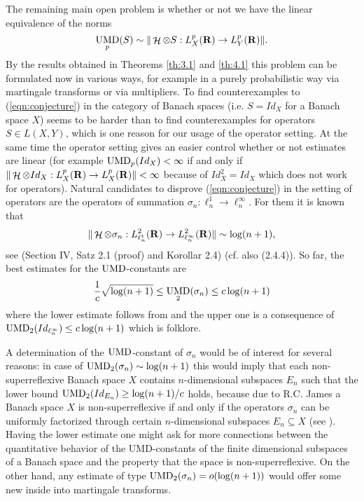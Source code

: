 \documentclass[11pt,a4paper,twoside,draft]{amsart}
\theoremstyle{definition}
\newcommand{\real}{{\bf R}}
\DeclareMathOperator{\htt}{{\mathcal H}}
\DeclareMathOperator{\umd}{{\rm UMD}}
\begin{document}
The remaining main open problem is whether or not we have the linear equivalence 
of the norms
\begin{equation}\label{eqn:conjecture}
        \umd_p(S) 
   \sim \| \htt\otimes S : L^p_X(\real)    \to L_Y^p(\real) \|.
\end{equation}
By the results obtained in Theorems \ref{th:3.1} and  \ref{th:4.1}
this problem can be formulated now in 
various ways, for example in a purely probabilistic way via 
martingale transforms or via multipliers. 
To find counterexamples to (\ref{eqn:conjecture})
in the category of Banach spaces (i.e. $S=Id_X$ for a 
Banach space $X$) seems to be 
harder than to find counterexamples for operators $S\in L(X,Y)$,
which is one reason for our usage of the operator setting.
At the same time the operator setting gives an easier control whether
or not estimates are linear 
(for example 
$\umd_p(Id_X)<\infty$ if and only if 
$\| \htt\otimes Id_X : L^p_X(\real)    \to L_X^p(\real) \|<\infty$
because of $Id_X^2=Id_X$ which does not work for operators).
Natural candidates to disprove (\ref{eqn:conjecture}) 
in the setting of operators are the operators of summation 
$\sigma_n:\ell^1_n\to\ell^\infty_n$. For them it is known that 
\[      \| \htt\otimes \sigma_n : L^2_{\ell^1_n}(\real) \to L_{\ell^\infty_n}^2(\real) \|
   \sim \log(n+1), \]
see \cite{DefantM-PHD} (Section IV, Satz 2.1 (proof) and Korollar 2.4)
(cf. also \cite{Pietsch-Wenzel} (2.4.4)).
So far, the best estimates for the $\umd$-constants are
\[     \frac{1}{c}\sqrt{\log(n+1)}
   \le \umd_2(\sigma_n) \le c \log(n+1) \]
where the lower estimate follows from \cite{Geiss8.5} 
and the upper one is a consequence of 
$\umd_2(Id_{\ell^\infty_n}) \le c \log(n+1)$ which is folklore.

A determination of the $\umd$-constant of $\sigma_n$ would be of interest for 
several reasons:
in case of $\umd_2(\sigma_n) \sim  \log(n+1)$ this would imply that each
non-superreflexive Banach space $X$ contains $n$-dimensional subspaces $E_n$
such that the lower bound $\umd_2(Id_{E_n}) \ge \log(n+1)/c$ holds, because
due to R.C. James a Banach space $X$ is non-superreflexive 
if and only if the operators $\sigma_n$ can be uniformly factorized through
certain $n$-dimensional subspaces $E_n\subseteq X$ (see \cite{James}).
Having the lower estimate one might ask for more connections between the
quantitative behavior of the UMD-constants of the finite dimensional subspaces 
of a Banach space and the property that the space is non-super\-reflexive.    
On the other hand, any estimate
of type $\umd_2(\sigma_n) = o(\log(n+1))$ would offer some new inside into
martingale transforms. 
\end{document}
